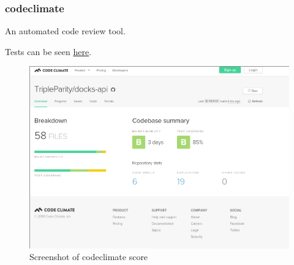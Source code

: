 \documentclass[]{article}
\begin{document}
\pagebreak

\subsubsection{codeclimate}
An automated code review tool.

Tests can be seen \href{https://codeclimate.com/github/TripleParity/docker-ui}{here}.
\begin{figure}[H]
	\centering
	\includegraphics[scale=0.4]{codeclimate_api.png}
	\caption{Screenshot of codeclimate score}
\end{figure}
\end{document}
